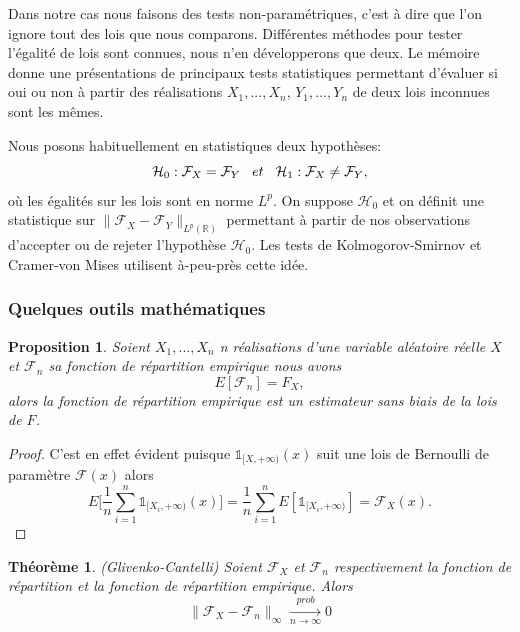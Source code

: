 \documentclass[a4paper,11pt]{article}
\newtheorem{theorem}{Théorème}[section]
\newtheorem{proposition}{Proposition}
\begin{document}
Dans notre cas nous faisons des tests non-paramétriques, c'est à dire que l'on ignore tout des lois que nous comparons.
Différentes méthodes pour tester l'égalité de lois sont connues, nous n'en développerons que deux. Le mémoire \cite{ethier2011propos} donne une présentations de principaux tests statistiques permettant d'évaluer si oui ou non à partir des réalisations $X_1,...,X_n$, $Y_1,...,Y_n$ de deux lois inconnues sont les mêmes. 

Nous posons habituellement en statistiques deux hypothèses:
\[ \mathcal{H}_0: \mathcal{F}_{X} = \mathcal{F}_{Y} \hspace{3mm} et \hspace{3mm} \mathcal{H}_1: \mathcal{F}_{X} \neq \mathcal{F}_{Y},\]
où les égalités sur les lois sont en norme $L^p$. On suppose $\mathcal{H}_0$ et on définit une statistique sur $\|\mathcal{F}_{X}-\mathcal{F}_{Y}\|_{L^p(\mathbb{R})}$ permettant à partir de nos observations d'accepter ou de rejeter l'hypothèse $\mathcal{H}_0$.
Les tests de Kolmogorov-Smirnov et Cramer-von Mises utilisent à-peu-près cette idée. 

\subsubsection{Quelques outils mathématiques}

\begin{proposition}
	\label{mean-rep-emp}
	Soient $X_1,...,X_n$ n réalisations d'une variable aléatoire réelle $X$ et $\mathcal{F}_{n}$ sa fonction de répartition empirique nous avons
	\[E[\mathcal{F}_n]=F_{X},\]
	alors la fonction de répartition empirique est un estimateur sans biais de la lois de $F$. 
\end{proposition}

\begin{proof}
	C'est en effet évident puisque $\mathds{1}_{[X, +\infty )}(x)$ suit une lois de Bernoulli de paramètre $\mathcal{F}(x)$ alors 
	\[E\Big[\frac{1}{n}\sum_{i=1}^{n}\mathds{1}_{[X_i, +\infty )}(x)\Big]= \frac{1}{n}\sum_{i=1}^{n}E[\mathds{1}_{[X_i, +\infty )}]=\mathcal{F}_{X}(x).\]
\end{proof}


\begin{theorem}(Glivenko-Cantelli)
	\label{th-glivenko}
Soient $\mathcal{F}_{X}$ et $\mathcal{F}_{n}$ respectivement la fonction de répartition et la fonction de répartition empirique. Alors 
\begin{equation}
	\|\mathcal{F}_{X}-\mathcal{F}_{n}\|_{\infty} \xrightarrow[n\to \infty]{prob} 0 
\end{equation}
\end{theorem}
\end{document}
